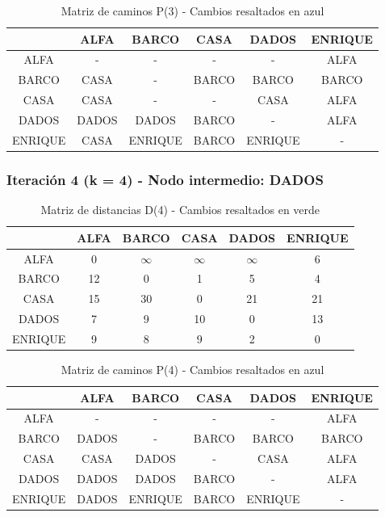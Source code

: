 \documentclass[12pt]{article}
\begin{document}
\begin{table}[h!]
\centering
\begin{tabular}{|c|c|c|c|c|c|}
\hline
 & ALFA & BARCO & CASA & DADOS & ENRIQUE \\\hline
ALFA & - & - & - & - & ALFA \\\hline
BARCO & \cellcolor{lightblue} CASA & - & BARCO & BARCO & BARCO \\\hline
CASA & CASA & - & - & CASA & ALFA \\\hline
DADOS & DADOS & DADOS & BARCO & - & ALFA \\\hline
ENRIQUE & \cellcolor{lightblue} CASA & ENRIQUE & BARCO & ENRIQUE & - \\\hline
\end{tabular}
\caption{Matriz de caminos P(3) - Cambios resaltados en azul}
\end{table}

\subsubsection{Iteración 4 (k = 4) - Nodo intermedio: DADOS}
\begin{table}[h!]
\centering
\begin{tabular}{|c|c|c|c|c|c|}
\hline
 & ALFA & BARCO & CASA & DADOS & ENRIQUE \\\hline
ALFA & 0 & $\infty$ & $\infty$ & $\infty$ & 6 \\\hline
BARCO & \cellcolor{lightgreen} 12 & 0 & 1 & 5 & 4 \\\hline
CASA & 15 & \cellcolor{lightgreen} 30 & 0 & 21 & 21 \\\hline
DADOS & 7 & 9 & 10 & 0 & 13 \\\hline
ENRIQUE & \cellcolor{lightgreen} 9 & 8 & 9 & 2 & 0 \\\hline
\end{tabular}
\caption{Matriz de distancias D(4) - Cambios resaltados en verde}
\end{table}

\begin{table}[h!]
\centering
\begin{tabular}{|c|c|c|c|c|c|}
\hline
 & ALFA & BARCO & CASA & DADOS & ENRIQUE \\\hline
ALFA & - & - & - & - & ALFA \\\hline
BARCO & \cellcolor{lightblue} DADOS & - & BARCO & BARCO & BARCO \\\hline
CASA & CASA & \cellcolor{lightblue} DADOS & - & CASA & ALFA \\\hline
DADOS & DADOS & DADOS & BARCO & - & ALFA \\\hline
ENRIQUE & \cellcolor{lightblue} DADOS & ENRIQUE & BARCO & ENRIQUE & - \\\hline
\end{tabular}
\caption{Matriz de caminos P(4) - Cambios resaltados en azul}
\end{table}
\end{document}
